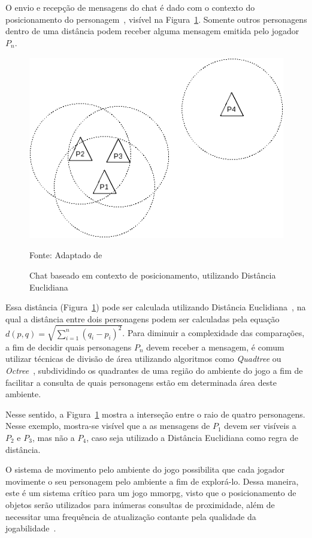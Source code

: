 O envio e recepção de mensagens do chat é dado com o contexto do posicionamento do personagem~\cite{albion_online_unite}, visível na Figura~\ref{fig:chat}.
%
Somente outros personagens dentro de uma distância podem receber alguma mensagem emitida pelo jogador $P_n$.

\begin{figure}[htb!]
\caption{Chat baseado em contexto de posicionamento, utilizando Distância Euclidiana}
\label{fig:chat}
\includegraphics[height=8cm]{img/cap2/chat.png}
\centering

Fonte: Adaptado de ~\cite{albion_online_unite}
\end{figure}

Essa distância (Figura~\ref{fig:chat}) pode ser calculada utilizando Distância Euclidiana~\cite{Deza2009Aug}, na qual a distância entre dois personagens podem ser calculadas pela equação $d(p, q) = \sqrt{\sum_{i=1}^{n}(q_i - p_i)^2}$.
%
Para diminuir a complexidade das comparações, a fim de decidir quais personagens $P_n$ devem receber a mensagem, é comum utilizar técnicas de divisão de área utilizando algoritmos como \textit{Quadtree} ou \textit{Octree}~\cite{Lengyel2011Jun}, subdividindo os quadrantes de uma região do ambiente do jogo a fim de facilitar a consulta de quais personagens estão em determinada área deste ambiente.


Nesse sentido, a Figura~\ref{fig:chat} mostra a interseção entre o raio de quatro personagens.
%
Nesse exemplo, mostra-se visível que a as mensagens de $P_1$ devem ser visíveis a $P_2$ e $P_3$, mas não a $P_4$, caso seja utilizado a Distância Euclidiana como regra de distância.



O sistema de movimento pelo ambiente do jogo possibilita que cada jogador movimente o seu personagem pelo ambiente a fim de explorá-lo.
%
Dessa maneira, este é um sistema crítico para um jogo \ac{mmorpg}, visto que o posicionamento de objetos serão utilizados para inúmeras consultas de proximidade, além de necessitar uma frequência de atualização contante pela qualidade da jogabilidade~\cite{albion_online_unite}.


